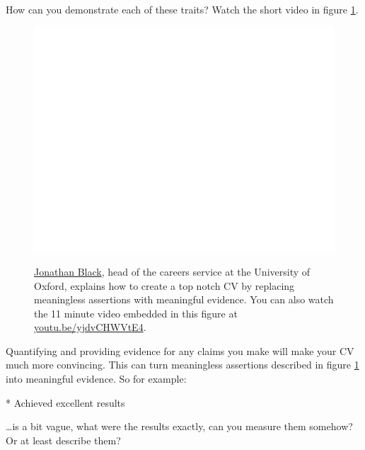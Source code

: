 \documentclass[
]{book}
\newenvironment{Shaded}{\begin{snugshade}}{\end{snugshade}}
\newcommand{\NormalTok}[1]{#1}
\newcommand{\SpecialStringTok}[1]{\textcolor[rgb]{0.31,0.60,0.02}{#1}}
\begin{document}
How can you demonstrate each of these traits? Watch the short video in figure \ref{fig:black-fig}.

\begin{figure}

{\centering \href{https://www.youtube.com/embed/yjdvCHWVtE4}{\includegraphics[width=0.99\linewidth]{cdyf_files/figure-latex/black-fig-1} }

}

\caption{\href{https://twitter.com/jonathanpblack}{Jonathan Black}, head of the careers service at the University of Oxford, explains how to create a top notch CV by replacing meaningless assertions with meaningful evidence. You can also watch the 11 minute video embedded in this figure at \href{https://youtu.be/yjdvCHWVtE4}{youtu.be/yjdvCHWVtE4}. \citep{topnotchcv}}\label{fig:black-fig}
\end{figure}



Quantifying and providing evidence for any claims you make will make your CV much more convincing. This can turn meaningless assertions described in figure \ref{fig:black-fig} into meaningful evidence. So for example:

\begin{Shaded}
\begin{Highlighting}[]
\SpecialStringTok{* }\NormalTok{Achieved excellent results}
\end{Highlighting}
\end{Shaded}

\ldots is a bit vague, what were the results exactly, can you measure them somehow? Or at least describe them?
\end{document}
